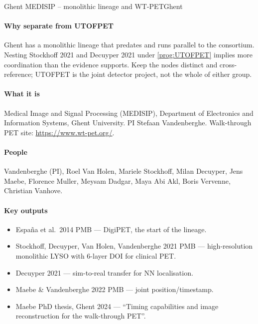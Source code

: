 \begin{programnote}{Ghent MEDISIP -- monolithic lineage and WT-PET}{Ghent}
 
\paragraph{Why separate from UTOFPET}
Ghent has a monolithic lineage that predates and runs parallel to the
consortium. Nesting Stockhoff 2021 and Decuyper 2021 under \ref{prog:UTOFPET}
implies more coordination than the evidence supports. Keep the nodes distinct
and cross-reference; UTOFPET is the joint detector project, not the whole of
either group.
 
\paragraph{What it is}
Medical Image and Signal Processing (MEDISIP), Department of Electronics and
Information Systems, Ghent University. PI Stefaan Vandenberghe. Walk-through
PET site: \url{https://www.wt-pet.org/}.
 
\paragraph{People}
Vandenberghe (PI), Roel Van Holen, Mariele Stockhoff, Milan Decuyper, Jens
Maebe, Florence Muller, Meysam Dadgar, Maya Abi Akl, Boris Vervenne, Christian
Vanhove.
 
\paragraph{Key outputs}
\begin{itemize}
	\item Espa\~na et al.\ 2014 PMB --- DigiPET, the start of the lineage.
	\item Stockhoff, Decuyper, Van Holen, Vandenberghe 2021 PMB ---
		high-resolution monolithic LYSO with 6-layer DOI for clinical PET.
	\item Decuyper 2021 --- sim-to-real transfer for NN localisation.
	\item Maebe \& Vandenberghe 2022 PMB --- joint position/timestamp.
	\item Maebe PhD thesis, Ghent 2024 --- ``Timing capabilities and image
		reconstruction for the walk-through PET''.
\end{itemize}
 

\end{programnote}
